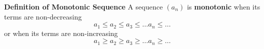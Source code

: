 \nopagenumbers
{\bf Definition of Monotonic Sequence}
\vskip 6pt
A sequence $(a_n)$ is {\bf monotonic} when its terms are non-decreasing $$a_1 \leq a_2 \leq a_3 \leq \ldots a_n \leq \ldots$$ or when its terms are non-increasing $$a_1 \geq a_2 \geq a_3 \geq \ldots a_n \geq \ldots$$

\vfill\eject
